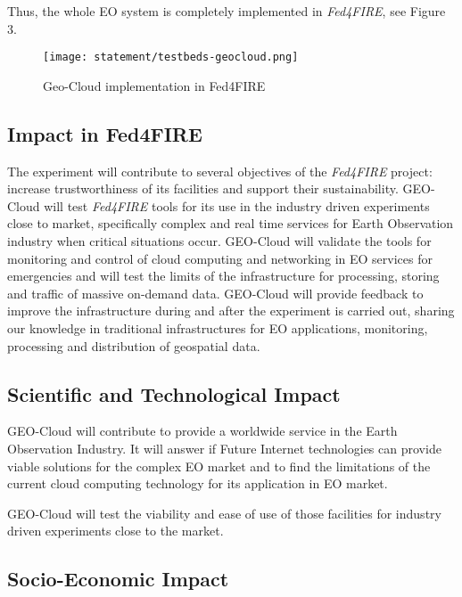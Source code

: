Thus, the whole \ac{EO} system is completely implemented in \emph{Fed4FIRE}, see Figure 3.

\begin{figure}[!h]
\begin{center}
\texttt{[image: statement/testbeds-geocloud.png]}
\caption{Geo-Cloud implementation in Fed4FIRE}
\label{fig:intr-testbeds-geocloud}
\end{center}
\end{figure}




\subsection{Impact in Fed4FIRE}
The experiment will contribute to several objectives of the \emph{Fed4FIRE} project:
increase trustworthiness of its facilities and support their
sustainability. GEO-Cloud will test \emph{Fed4FIRE} tools for its use in the industry
driven experiments close to market, specifically complex and real time services
for Earth Observation industry when critical situations occur. 
GEO-Cloud will validate the tools for monitoring and control of cloud computing
and networking in EO services for emergencies and will test the limits of the
infrastructure for processing, storing and traffic of massive on-demand
data. GEO-Cloud will provide feedback to improve the infrastructure during and
after the experiment is carried out, sharing our knowledge in traditional
infrastructures for \ac{EO} applications, monitoring, processing and
distribution of geospatial data.

\subsection{Scientific and Technological Impact}

GEO-Cloud will contribute to provide a worldwide service in the Earth
Observation Industry. It will answer if Future Internet technologies can provide
viable solutions for the complex \ac{EO} market and to find the limitations of
the current cloud computing technology for its application in \ac{EO} market.
 
GEO-Cloud will test the viability and ease of use of those facilities for
industry driven experiments close to the market.

\subsection{Socio-Economic Impact}

